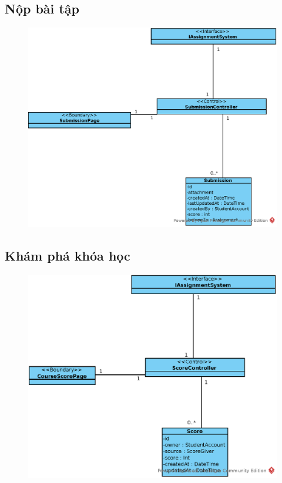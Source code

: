 \documentclass[./../main_file.tex]{subfiles}
\begin{document}
\subsection{Nộp bài tập}
\begin{figure}[H]
	\centering
	\includegraphics[width=\linewidth]{./images/define_attribute/ucd_at_ss_submit_assignment.eps}
\end{figure}
\subsection{Khám phá khóa học}
\begin{figure}[H]
	\centering
	\includegraphics[width=\linewidth]{./images/define_attribute/ucd_at_ss_check_course_progress.eps}
\end{figure}
\end{document}
